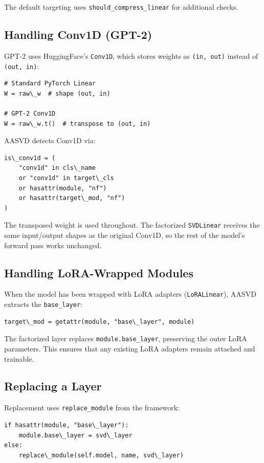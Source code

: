 The default targeting uses \texttt{should\_compress\_linear} for additional checks.

\subsection{Handling Conv1D (GPT-2)}

GPT-2 uses HuggingFace's \texttt{Conv1D}, which stores weights as \texttt{(in, out)} 
instead of \texttt{(out, in)}:

\begin{lstlisting}
# Standard PyTorch Linear
W = raw\_w  # shape (out, in)

# GPT-2 Conv1D
W = raw\_w.t()  # transpose to (out, in)
\end{lstlisting}

AASVD detects Conv1D via:

\begin{lstlisting}
is\_conv1d = (
    "conv1d" in cls\_name 
    or "conv1d" in target\_cls 
    or hasattr(module, "nf") 
    or hasattr(target\_mod, "nf")
)
\end{lstlisting}

The transposed weight is used throughout. The factorized \texttt{SVDLinear} 
receives the same input/output shapes as the original Conv1D, so the 
rest of the model's forward pass works unchanged.

\subsection{Handling LoRA-Wrapped Modules}

When the model has been wrapped with LoRA adapters (\texttt{LoRALinear}), AASVD 
extracts the \texttt{base\_layer}:

\begin{lstlisting}
target\_mod = getattr(module, "base\_layer", module)
\end{lstlisting}

The factorized layer replaces \texttt{module.base\_layer}, preserving the outer 
LoRA parameters. This ensures that any existing LoRA adapters remain 
attached and trainable.

\subsection{Replacing a Layer}

Replacement uses \texttt{replace\_module} from the framework:

\begin{lstlisting}
if hasattr(module, "base\_layer"):
    module.base\_layer = svd\_layer
else:
    replace\_module(self.model, name, svd\_layer)
\end{lstlisting}

